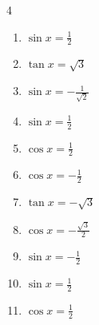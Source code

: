 \begin{multicols}{4}
\begin{enumerate}

  \item $\displaystyle \sin{x}  = \frac{1}{2}$


\columnbreak %

  \item $\displaystyle \tan{x}  = \sqrt{3}$


  \item $\displaystyle \sin{x}  = -\frac{1}{\sqrt{2}}$


  \item $\displaystyle \sin{x}  = \frac{1}{2}$


  \item $\displaystyle \cos{x}  = \frac{1}{2}$


  \item $\displaystyle \cos{x}  = -\frac{1}{2}$


  \item $\displaystyle \tan{x}  = -\sqrt{3}$


  \item $\displaystyle \cos{x}  = -\frac{\sqrt{3}}{2}$


  \item $\displaystyle \sin{x}  = -\frac{1}{2}$


  \item $\displaystyle \sin{x}  = \frac{1}{2}$


  \item $\displaystyle \cos{x}  = \frac{1}{2}$


\end{enumerate}
\end{multicols}
